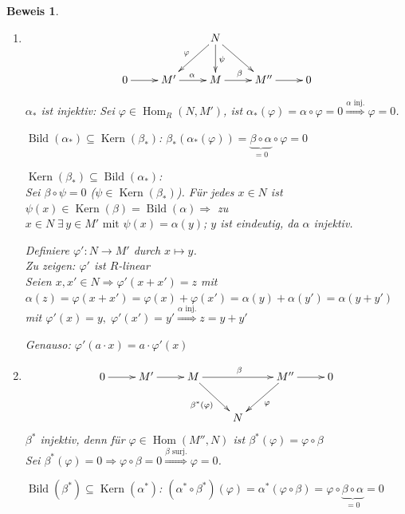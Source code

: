 \documentclass[a4paper,12pt]{scrbook}
\theoremstyle{break}
\theoremstyle{nonumberbreak}
\newtheorem{Bew}{Beweis}
\theoremstyle{nonumberplain}
\DeclareMathOperator{\Hom}{Hom}
\DeclareMathOperator{\Kern}{Kern}
\DeclareMathOperator{\Bild}{Bild}
\begin{document}
\begin{Bew}
  \begin{enumerate}
  \item $$
    \begin{xy}
      \xymatrix{
        &                    &  N \ar[ld]_\varphi \ar[d]^\psi \ar[dr] & & \\
	0 \ar[r] & M' \ar[r]^{\alpha} & M \ar[r]^{\beta} & M'' \ar[r] & 0
      }
    \end{xy}
    $$

    $\alpha_*$ ist injektiv: Sei $\varphi \in \Hom_R(N,M')$, ist
    $\alpha_*(\varphi) = \alpha \circ \varphi = 0 \overset{\alpha \text{ inj.}}{\Rightarrow} \varphi = 0$.

    $\Bild(\alpha_*) \subseteq \Kern(\beta_*)$:
    $\beta_*(\alpha_*(\varphi)) = \underset{=0}{\underbrace{\beta \circ \alpha}} \circ \varphi = 0$

    $\Kern(\beta_*) \subseteq \Bild(\alpha_*)$:\\
    Sei $\beta \circ \psi = 0$ ($\psi \in \Kern(\beta_*)$). Für jedes $x \in N$ ist $\psi(x) \in
    \Kern(\beta) = \Bild(\alpha) \Rightarrow$ zu $x \in N \;
    \exists\, y \in M' \text{ mit } \psi(x) = \alpha(y)$; $y$ ist
    eindeutig, da $\alpha$ injektiv.
    
    Definiere $\varphi': N \to M'$ durch $x \mapsto y$.\\
    Zu zeigen: $\varphi'$ ist $R$-linear\\
    Seien $x,x' \in N \Rightarrow \varphi'(x+x')=z$ mit $\alpha(z) =
    \varphi(x+x') = \varphi(x) + \varphi(x') = \alpha(y) + \alpha(y') =
    \alpha(y +y')$ mit $\varphi'(x) = y, \; \varphi'(x') = y'
    \overset{\alpha \text{ inj.}}{\Rightarrow} z = y + y'$

    Genauso: $\varphi'(a \cdot x) = a \cdot \varphi'(x)$
  \item \[
    \begin{xy}
      \xymatrix{
        0 \ar[r] & M' \ar[r] & M \ar[rr]^{\beta} \ar[rd]_{\beta^*(\varphi)} &  &  M'' \ar[dl]^{\varphi} \ar[r] & 0 \\
        & & & N & }
    \end{xy}
    \]
    $\beta^*$ injektiv, denn für $\varphi \in \Hom(M'', N)$ ist
    $\beta^*(\varphi)=\varphi\circ \beta$\\
    Sei $\beta^*(\varphi)= 0 \Rightarrow \varphi \circ \beta = 0 \overset{\beta
      \text{ surj.}}{\Rightarrow}\varphi=0$.

    $\Bild(\beta^*) \subseteq \Kern(\alpha^*)$: $(\alpha^* \circ 
    \beta^*)(\varphi)= \alpha^*(\varphi\circ \beta)=\varphi \circ
    \underbrace{\beta \circ \alpha}_{=0}=0$


\end{enumerate}
\end{Bew}
\end{document}
